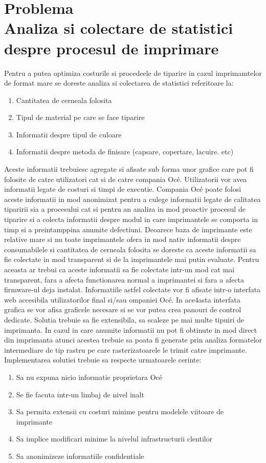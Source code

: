 \documentclass[12pt]{report}
\begin{document}
	\section[Problema]{Problema \\ {\large Analiza si colectare de statistici despre procesul de imprimare}}

Pentru a putea optimiza costurile si procedeele de tiparire in cazul imprimamtelor de format mare se doreste analiza si colectarea de statistici referitoare la: 
\begin{enumerate}
\item Cantitatea de cerneala folosita
\item Tipul de material pe care se face tiparire
\item Informatii despre tipul de culoare 
\item Informatii despre metoda de finisare (capsare, copertare, lacuire. etc)
\end{enumerate}
Aceste informatii trebuiesc agregate si afisate sub forma unor grafice care pot fi folosite de catre utilizatori cat si de catre compania Océ. Utilizatorii vor avea informatii legate de costuri si timpi de executie. Compania Océ poate folosi aceste informatii in mod anonimizat pentru a culege informatii legate de calitatea tiparirii sia a procesului cat si pentru an analiza in mod proactiv procesul de tiparire si a colecta informatii despre modul in care imprimantele se comporta in timp si a preintamppina anumite defectiuni. 
Deoarece baza de imprimante este relative mare si nu toate imprimantele ofera in mod nativ informatii despre consumabilele si cantitatea de cerneala folosita se doreste ca aceste informatii sa fie colectate in mod transparent si de la imprimantele mai putin evaluate. Pentru aceasta ar trebui ca aceste informatii sa fie colectate intr-un mod cat mai transparent, fara a afecta functionarea normal a imprimantei si fara a afecta firmware-ul deja instalat. 
Informatiile astfel colectate  vor fi afisate intr-o interfata web accesibila utilizatorilor final si/sau ompaniei Océ. In ace4asta interfata grafica se vor afisa graficele necesare si se vor putea crea panouri de control dedicate.
Solutia trebuie sa fie extensibila, sa scaleze pe mai multe tipuiri de imprimanta. 
In cazul in care anumite informatii nu pot fi obtinute in mod direct din imprimanta atunci acestea trebuie sa poata fi generate prin analiza formatelor intermediare de tip rastru pe care rasterizatoarele le trimit catre imprimante. 
Implementarea solutiei trebuie sa respecte urmatoarele cerinte:
\begin{enumerate}
\item Sa nu expuna nicio informatie proprietara Océ
\item Se fie facuta intr-un limbaj de nivel inalt
\item Sa permita extensii cu costuri minime pentru modelele viitoare de imprimante
\item Sa implice  modificari minime la nivelul infrastructurii clentilor
\item Sa anonimizeze informatiile confidentiale 
\end{enumerate}
\end{document}
